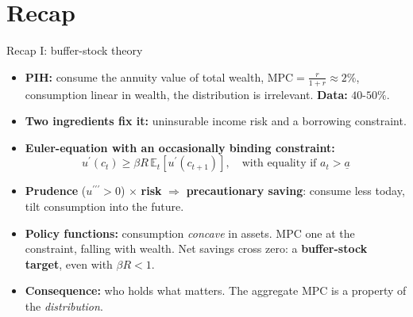 \documentclass[
  10pt,
  ignorenonframetext,
  aspectratio=43,
  english,
  handout]{beamer}
\providecommand{\tightlist}{%
  \setlength{\itemsep}{0pt}\setlength{\parskip}{0pt}}
\begin{document}
\section{Recap}\label{recap}

\begin{frame}{Recap I: buffer-stock theory}
\protect{}\label{recap-i-buffer-stock-theory}
\begin{itemize}
\tightlist
\item
  \textbf{PIH:} consume the annuity value of total wealth, \(\text{MPC}=\frac{r}{1+r}\approx2\%\), consumption linear in wealth, the distribution is irrelevant. \textbf{Data:} \(40\)-\(50\%\).
\item
  \textbf{Two ingredients fix it:} uninsurable income risk and a borrowing constraint.
\item
  \textbf{Euler-equation with an occasionally binding constraint:}
  \[
  u^{\prime}(c_{t})\geq\beta R\,\mathbb{E}_{t}\left[u^{\prime}(c_{t+1})\right],\quad\text{with equality if }a_{t}>\underline{a}
  \]
\item
  \textbf{Prudence} (\(u^{\prime\prime\prime}>0\)) \(\times\) \textbf{risk} \(\Rightarrow\) \textbf{precautionary saving}: consume less today, tilt consumption into the future.
\item
  \textbf{Policy functions:} consumption \emph{concave} in assets. MPC one at the constraint, falling with wealth. Net savings cross zero: a \textbf{buffer-stock target}, even with \(\beta R<1\).
\item
  \textbf{Consequence:} who holds what matters. The aggregate MPC is a property of the \emph{distribution}.
\end{itemize}
\end{frame}
\end{document}
